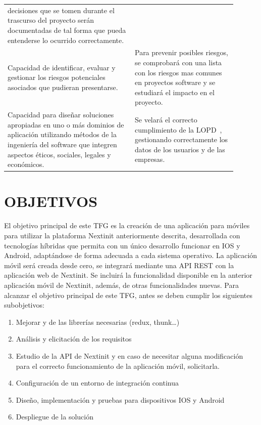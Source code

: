 \documentclass{pre-tfg}
\begin{document}
\begin{table}[hp]
\begin{tabular}{p{0.5\linewidth}p{0.4\linewidth}}
            decisiones que se tomen durante el trascurso del proyecto serán documentadas de tal forma que
            pueda entenderse lo ocurrido correctamente. \\
            Capacidad de identificar, evaluar y gestionar los riesgos potenciales asociados que pudieran presentarse.
            & Para prevenir posibles riesgos, se comprobará con una lista con los riesgos mas comunes en proyectos
            software y se estudiará el impacto en el proyecto. \\
            Capacidad para diseñar soluciones apropiadas en uno o más dominios de aplicación utilizando métodos
            de la ingeniería del software que integren aspectos éticos, sociales, legales y económicos.
            & Se velará el correcto cumplimiento de la LOPD~\cite{LOPD}, gestionando correctamente los datos de los
            usuarios y de las empresas.\\
            \hline
        \end{tabular}
    \end{table}

	\clearpage

    \section{OBJETIVOS}

    El objetivo principal de este TFG es la creación de una aplicación para móviles para utilizar la plataforma 
    Nextinit anteriormente descrita, desarrollada con tecnologías híbridas que permita con un único 
    desarrollo funcionar en IOS y Android, adaptándose de forma adecuada a cada sistema operativo. La 
    aplicación móvil será creada desde cero, se integrará mediante una API REST con la aplicación web de 
    Nextinit. Se incluirá la funcionalidad disponible en la anterior aplicación móvil de Nextinit, además, de otras 
    funcionalidades nuevas.
    \newline\newline
    Para alcanzar el objetivo principal de este TFG, antes se deben cumplir los siguientes subobjetivos:
    \begin{enumerate}
        \item Mejorar 
        y de las librerías necesarias (redux, thunk…)
        \item Análisis y elicitación de los requisitos
        \item Estudio de la API de Nextinit y en caso de necesitar alguna modificación para el correcto
        funcionamiento de la aplicación móvil, solicitarla.
        \item Configuración de un entorno de integración continua
        \item Diseño, implementación y pruebas para dispositivos IOS y Android
        \item Despliegue de la solución
    \end{enumerate}
\end{document}
